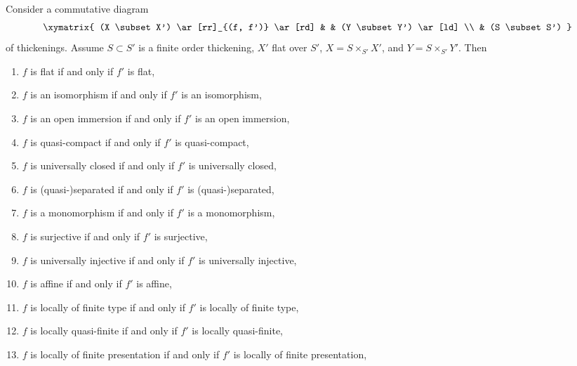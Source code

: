 %
\begin{lemma}
\label{lemma-deform-property}
Consider a commutative diagram
$$
\xymatrix{
(X \subset X') \ar[rr]_{(f, f')} \ar[rd] & & (Y \subset Y') \ar[ld] \\
& (S \subset S')
}
$$
of thickenings. Assume $S \subset S'$ is a finite order thickening,
$X'$ flat over $S'$, $X = S \times_{S'} X'$, and
$Y = S \times_{S'} Y'$. Then
\begin{enumerate}
\item $f$ is flat if and only if $f'$ is flat,
\label{item-flat}
\item $f$ is an isomorphism if and only if $f'$ is an isomorphism,
\label{item-isomorphism}
\item $f$ is an open immersion if and only if $f'$ is an open immersion,
\label{item-open-immersion}
\item $f$ is quasi-compact if and only if $f'$ is quasi-compact,
\label{item-quasi-compact}
\item $f$ is universally closed if and only if $f'$ is universally closed,
\label{item-universally-closed}
\item $f$ is (quasi-)separated if and only if $f'$ is (quasi-)separated,
\label{item-separated}
\item $f$ is a monomorphism if and only if $f'$ is a monomorphism,
\label{item-monomorphism}
\item $f$ is surjective if and only if $f'$ is surjective,
\label{item-surjective}
\item $f$ is universally injective if and only if $f'$ is universally injective,
\label{item-universally-injective}
\item $f$ is affine if and only if $f'$ is affine,
\label{item-affine}
\item
\label{item-finite-type}
$f$ is locally of finite type if and only if $f'$ is locally of finite type,
\item $f$ is locally quasi-finite if and only if $f'$ is locally quasi-finite,
\label{item-quasi-finite}
\item
\label{item-finite-presentation}
$f$ is locally of finite presentation if and only if $f'$ is locally of
finite presentation,

\end{enumerate}
\end{lemma}
